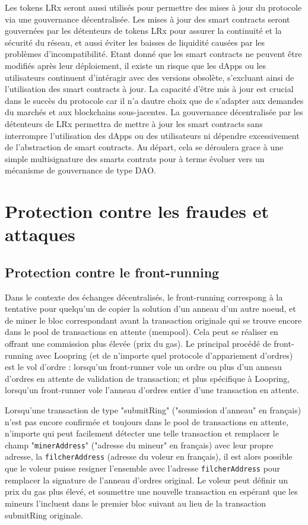 \documentclass[UTF8,nofonts]{article}
\begin{document}
\begin{multicols}{2}
Les tokens LRx seront aussi utilisés pour permettre des mises à jour du protocole via une gouvernance décentralisée. Les mises à jour des smart contracts seront gouvernées par les détenteurs de tokens LRx pour assurer la continuité et la sécurité du réseau, et aussi éviter les baisses de liquidité causées par les problèmes d'incompatibilité. Etant donné que les smart contracts ne peuvent être modifiés après leur déploiement, il existe un risque que les dApps ou les utilisateurs continuent d'intéragir avec des versions obsolète, s'excluant ainsi de l'utilisation des smart contracts à jour. La capacité d'être mis à jour est crucial dans le succès du protocole car il n'a dautre choix que de s'adapter aux demandes du marchés et aux blockchains sous-jacentes. La gouvernance décentralisée par les détenteurs de LRx permettra de mettre à jour les smart contracts sans interrompre l'utilisation des dApps ou des utilisateurs ni dépendre excessivement de l'abstraction de smart contracts. Au départ, cela se déroulera grace à une simple multisignature des smarts contrats pour à terme évoluer vers un mécanisme de gouvernance de type DAO.

\section{Protection contre les fraudes et attaques}

\subsection{Protection contre le front-running\label{sec:dual_authoring}}

Dans le contexte des échanges décentralisés, le front-running correspong à la tentative pour quelqu'un de copier la solution d'un anneau d'un autre noeud, et de miner le bloc correspondant avant la transaction originale qui se trouve encore dans le pool de transactions en attente (mempool). Cela peut se réaliser en offrant une commission plus élevée (prix du gas). Le principal procédé de front-running avec Loopring (et de n'importe quel protocole d'appariement d'ordres) est le vol d'ordre : lorsqu'un front-runner vole un ordre ou plus d'un anneau d'ordres en attente de validation de transaction; et plus spécifique à Loopring, lorsqu'un front-runner vole l'anneau d'ordres entier d'une transaction en attente. 

Lorsqu'une transaction de type "submitRing" ("soumission d'anneau" en français) n'est pas encore confirmée et toujours dans le pool de transactions en attente, n'importe qui peut facilement détecter une telle transaction et remplacer le champ "\verb|minerAddress|" ("adresse du mineur" en français) avec leur propre adresse, la \verb|filcherAddress| (adresse du voleur en français), il est alors possible que le voleur puisse resigner l'ensemble avec l'adresse \verb|filcherAddress| pour remplacer la signature de l'anneau d'ordres original. Le voleur peut définir un prix du gas plus élevé, et soumettre une nouvelle transaction en espérant que les mineurs l'incluent dans le premier bloc suivant au lieu de la transaction submitRing originale.


\end{multicols}
\end{document}
